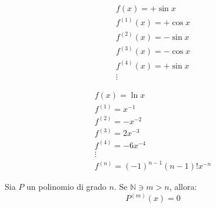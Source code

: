 \begin{example}
  \begin{gather*}
    f\left( x \right)=+\sin x\\
    f^{\left( 1 \right)}\left( x \right)=+\cos x\\
    f^{\left( 2 \right)}\left( x \right)=-\sin x\\
    f^{\left( 3 \right)}\left( x \right)=-\cos x\\
    f^{\left( 4 \right)}\left( x \right)=+\sin x\\
    \vdots
  \end{gather*}
\end{example}

\begin{example}
  \begin{gather*}
    f\left( x \right)=\ln x\\
    f^{\left( 1 \right)}=x^{-1}\\
    f^{\left( 2 \right)}=-x^{-2}\\
    f^{\left( 3 \right)}=2x^{-3}\\
    f^{\left( 4 \right)}=-6x^{-4}\\
    \vdots\\
    f^{\left( n \right)}=\left( -1 \right)^{n-1}\left( n-1 \right)!x^{-n}
  \end{gather*}
\end{example}

\begin{observation}
  Sia $P$ un polinomio di grado $n$. Se $\mathbb{N}\ni m>n$, allora:
  $$P^{\left( m \right)}\left( x \right)=0$$
\end{observation}

